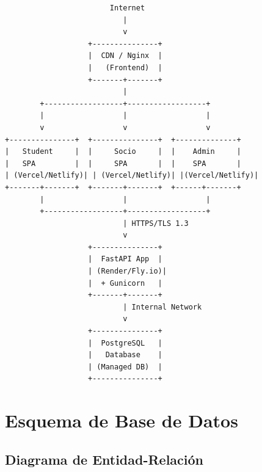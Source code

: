 \documentclass[12pt,a4paper]{article}
\begin{document}
\begin{verbatim}
                        Internet
                           |
                           v
                   +---------------+
                   |  CDN / Nginx  |
                   |   (Frontend)  |
                   +-------+-------+
                           |
        +------------------+------------------+
        |                  |                  |
        v                  v                  v
+---------------+  +---------------+  +--------------+
|   Student     |  |     Socio     |  |    Admin     |
|   SPA         |  |     SPA       |  |    SPA       |
| (Vercel/Netlify)| | (Vercel/Netlify)| |(Vercel/Netlify)|
+-------+-------+  +-------+-------+  +------+-------+
        |                  |                  |
        +------------------+------------------+
                           | HTTPS/TLS 1.3
                           v
                   +---------------+
                   |  FastAPI App  |
                   | (Render/Fly.io)|
                   |  + Gunicorn   |
                   +-------+-------+
                           | Internal Network
                           v
                   +---------------+
                   |  PostgreSQL   |
                   |   Database    |
                   | (Managed DB)  |
                   +---------------+
\end{verbatim}

\section{Esquema de Base de Datos}

\subsection{Diagrama de Entidad-Relación}
\end{document}
